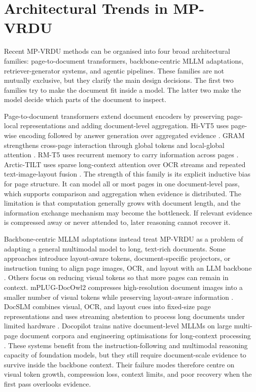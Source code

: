 \documentclass[10pt,a4paper]{article}
\begin{document}
\section{Architectural Trends in MP-VRDU}

Recent MP-VRDU methods can be organised into four broad architectural families: page-to-document transformers, backbone-centric MLLM adaptations, retriever-generator systems, and agentic pipelines. These families are not mutually exclusive, but they clarify the main design decisions. The first two families try to make the document fit inside a model. The latter two make the model decide which parts of the document to inspect.

Page-to-document transformers extend document encoders by preserving page-local representations and adding document-level aggregation. Hi-VT5 uses page-wise encoding followed by answer generation over aggregated evidence \cite{tito2023hierarchical}. GRAM strengthens cross-page interaction through global tokens and local-global attention \cite{blau2024gram}. RM-T5 uses recurrent memory to carry information across pages \cite{dong2024multi}. Arctic-TILT uses sparse long-context attention over OCR streams and repeated text-image-layout fusion \cite{borchmann2025arctic}. The strength of this family is its explicit inductive bias for page structure. It can model all or most pages in one document-level pass, which supports comparison and aggregation when evidence is distributed. The limitation is that computation generally grows with document length, and the information exchange mechanism may become the bottleneck. If relevant evidence is compressed away or never attended to, later reasoning cannot recover it.

Backbone-centric MLLM adaptations instead treat MP-VRDU as a problem of adapting a general multimodal model to long, text-rich documents. Some approaches introduce layout-aware tokens, document-specific projectors, or instruction tuning to align page images, OCR, and layout with an LLM backbone \cite{zhu2025simple,tanaka2024instructdoc}. Others focus on reducing visual tokens so that more pages can remain in context. mPLUG-DocOwl2 compresses high-resolution document images into a smaller number of visual tokens while preserving layout-aware information \cite{hu2025mplug}. DocSLM combines visual, OCR, and layout cues into fixed-size page representations and uses streaming abstention to process long documents under limited hardware \cite{hannan2025docslm}. Docopilot trains native document-level MLLMs on large multi-page document corpora and engineering optimisations for long-context processing \cite{duan2025docopilot}. These systems benefit from the instruction-following and multimodal reasoning capacity of foundation models, but they still require document-scale evidence to survive inside the backbone context. Their failure modes therefore centre on visual token growth, compression loss, context limits, and poor recovery when the first pass overlooks evidence.
\end{document}
